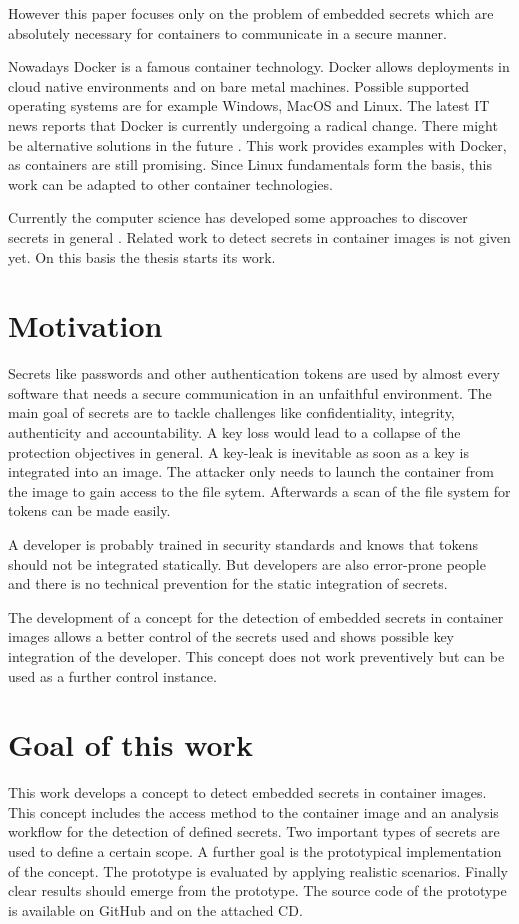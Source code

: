 However this paper focuses only on the problem of embedded secrets which are absolutely necessary for containers to communicate in a secure manner.

Nowadays Docker is a famous container technology. Docker allows deployments in cloud native environments and on bare metal machines. Possible supported operating systems are for example Windows, MacOS and Linux.
The latest IT news reports that Docker is currently undergoing a radical change. There might be alternative solutions in the future \cite{docker_heise}. This work provides examples with Docker, as containers are still promising. Since Linux fundamentals form the basis, this work can be adapted to other container technologies.

Currently the computer science has developed some approaches to discover secrets in general \cite{7180102}. Related work to detect secrets in container images is not given yet.
On this basis the thesis starts its work.

%
%
\section{Motivation}
\label{sec:intro:motivation}
Secrets like passwords and other authentication tokens are used by almost every software that needs a secure communication in an unfaithful environment. 
The main goal of secrets are to tackle challenges like confidentiality, integrity, authenticity and accountability. 
A key loss would lead to a collapse of the  protection objectives in general. A key-leak is inevitable as soon as a key is integrated into an image.
The attacker only needs to launch the container from the image to gain access to the file sytem. Afterwards a scan of the file system for tokens can be made easily. 

A developer is probably trained in security standards and knows that tokens should not be integrated statically. 
But developers are also error-prone people and there is no technical prevention for the static integration of secrets. 

The development of a concept for the detection of embedded secrets in container images allows a better control of the secrets used and shows possible key integration of the developer. 
This concept does not work preventively but can be used as a further control instance.%
%
\section{Goal of this work}
\label{sec:intro:goal}
This work develops a concept to detect embedded secrets in container images. 
This concept includes the access method to the container image and an analysis workflow for the detection of defined secrets. 
Two important types of secrets are used to define a certain scope. A further goal is the prototypical implementation of the concept. 
The prototype is evaluated by applying realistic scenarios.
Finally clear results should emerge from the prototype. The source code of the prototype is available on GitHub \cite{} and on the attached CD.

